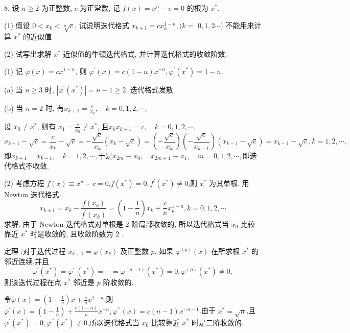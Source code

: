 \begin{tcolorbox}[breakable,enhanced,arc=0mm,outer arc=0mm,
		boxrule=0pt,toprule=1pt,leftrule=0pt,bottomrule=1pt, rightrule=0pt,left=0.2cm,right=0.2cm,
		titlerule=0.5em,toptitle=0.1cm,bottomtitle=-0.1cm,top=0.2cm,
		colframe=white!10!biru,colback=white!90!biru,coltitle=white,
            coltext=black,title =2024-04, title style={white!10!biru}, before skip=8pt, after skip=8pt,before upper=\hspace{2em},
		fonttitle=\bfseries,fontupper=\normalsize]
  
8. 设 $ n \geq 2 $ 为正整数, $ c $ 为正常数, 记 $ f(x)=x^{n}-c=0 $ 的根为 $ x^{*} $,

(1) 假设 $ 0<x_{k}<\sqrt[n]{c} $, 试说明迭代格式 $ x_{k+1}=c x_{k}^{1-n},(k= $ $ 0,1,2 \cdots) $ 不能用来计算 $ x^{*} $ 的近似值

(2) 试写出求解 $ x^{*} $ 近似值的牛顿迭代格式, 并计算迭代格式的收敛阶数.


\tcblower
 (1) 记 $ \varphi(x)=c x^{1-n} $, 则 $ \varphi^{\prime}(x)=c(1-n) x^{-n}, \varphi^{\prime}\left(x^{*}\right)=1-n $.
 
(a) 当 $ n \geqslant 3 $ 时, $ \left|\varphi^{\prime}\left(x^{*}\right)\right|=n-1 \geqslant 2 $, 迭代格式发散.

(b) 当 $ n=2 $ 时, 有$x_{k+1}=\frac{c}{x_{k}}, \quad k=0,1,2, \cdots,$ 

设 $x_{0} \neq x^{*}$, 则有 $x_{1}=\frac{c}{x_{0}} \neq x^{*}$, 且$x_{k} x_{k+1}=c, \quad k=0,1,2, \cdots$,
$$
x_{k+1}-\sqrt{c}=\frac{c}{x_{k}}-\sqrt{c}=-\frac{\sqrt{c}}{x_{k}}\left(x_{k}-\sqrt{c}\right) 
=\left(-\frac{\sqrt{c}}{x_{k}}\right)\left(-\frac{\sqrt{c}}{x_{k-1}}\right)\left(x_{k-1}-\sqrt{c}\right) 
=x_{k-1}-\sqrt{c},  k=1,2, \cdots,
$$
即$x_{k+1}=x_{k-1}, \quad k=1,2, \cdots,$于是$x_{2 m} \equiv x_{0}, \quad x_{2 m+1} \equiv x_{1}, \quad m=0,1,2, \cdots,$即迭代格式不收敛.

(2) 考虑方程 $ f(x) \equiv x^{n}-c=0 $,$f(x^*)=0, f^{\prime}(x^*)\neq0$,则 $ x^{*} $ 为其单根. 用 Newton 迭代格式:
$$
x_{k+1}=x_{k}-\frac{f\left(x_{k}\right)}{f^{\prime}\left(x_{k}\right)}=\left(1-\frac{1}{n}\right) x_{k}+\frac{c}{n} x_{k}^{1-n}, k=0,1,2, \cdots
$$
求解. 由于 Newton 迭代格式对单根是 2 阶局部收敛的, 所以迭代格式当 $ x_{0} $ 比较靠近 $ x^{*} $ 时是收敛的, 且收敛阶数为 2 .

\begin{tcolorbox}
    定理 :对于迭代过程 $ x_{k+1}=\varphi\left(x_{k}\right) $ 及正整数 $ p $, 如果 $ \varphi^{(p)}(x) $ 在所求根 $ x^{*} $ 的邻近连续,并且
$$
\varphi^{\prime}\left(x^{*}\right)=\varphi^{\prime \prime}\left(x^{*}\right)=\cdots=\varphi^{(p-1)}\left(x^{*}\right)=0, 
\varphi^{(p)}\left(x^{*}\right) \neq 0,
$$
则该迭代过程在点 $ x^{*} $ 邻近是 $ p $ 阶收敛的.
\end{tcolorbox}
令$\varphi(x)=(1-\frac 1n)x+\frac{c}{n}x^{1-n}$,则 $\varphi^{\prime}(x)=(1-\frac 1n)+\frac{c(1-n)}{n}x^{-n},\varphi^{\prime \prime}(x)=c(n-1)x^{-n-1}$.由于
$x^{*}=\sqrt{n}$,且$\varphi^{\prime}\left(x^{*}\right)=0,\varphi^{\prime \prime}\left(x^{*}\right) \neq 0$.所以迭代格式当 $ x_{0} $ 比较靠近 $ x^{*} $ 时是二阶收敛的.

\end{tcolorbox}


